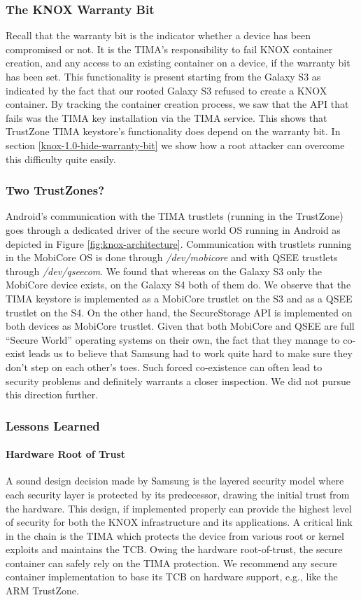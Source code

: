 \documentclass[11pt]{article}
\begin{document}
\subsubsection{The KNOX Warranty Bit} \label{knox-warranty-bit}
Recall that the warranty bit is the indicator whether a device has been compromised or not. 
It is the TIMA's responsibility to fail KNOX container creation, and any access to an existing container on a device, if the warranty bit has been set.
This functionality is present starting from the Galaxy S3 as indicated by the fact that our rooted Galaxy S3 refused to create a KNOX container.
By tracking the container creation process, we saw that the API that fails was the TIMA key installation via the TIMA service. 
This shows that TrustZone TIMA keystore's functionality does depend on the warranty bit. In section \ref{knox-1.0-hide-warranty-bit} we show 
how a root attacker can overcome this difficulty quite easily.

\subsubsection{Two TrustZones?}
Android's communication with the TIMA trustlets (running in the TrustZone) goes through a dedicated driver of the secure world OS running in Android
as depicted in Figure \ref{fig:knox-architecture}.
Communication with trustlets running in the MobiCore OS is done through \emph{/dev/mobicore} and with QSEE trustlets through \emph{/dev/qseecom}.
We found that whereas on the Galaxy S3 only the MobiCore device exists, on the Galaxy S4 both of them do.
We observe that the TIMA keystore is implemented as a MobiCore trustlet on the S3 and as a QSEE trustlet on the S4.
On the other hand, the SecureStorage API is implemented on both devices as MobiCore trustlet.
Given that both MobiCore and QSEE are full ``Secure World'' operating systems on their own, the fact that they manage to co-exist
leads us to believe that Samsung had to work quite hard to make sure they don't step on each other's toes. 
Such forced co-existence can often lead to security problems and definitely warrants a closer inspection. We did not pursue this direction further.

\subsubsection{Lessons Learned}
\paragraph{Hardware Root of Trust}
A sound design decision made by Samsung is the layered security model where each security layer is protected by its predecessor, drawing the initial
trust from the hardware. This design, if implemented properly can provide the highest level of security for both the KNOX infrastructure and its applications.
A critical link in the chain is the TIMA which protects the device from various root or kernel exploits and maintains the TCB. Owing the hardware root-of-trust,
the secure container can safely rely on the TIMA protection. We recommend any secure container implementation to base its TCB on hardware support, e.g., like the ARM TrustZone.
\end{document}
